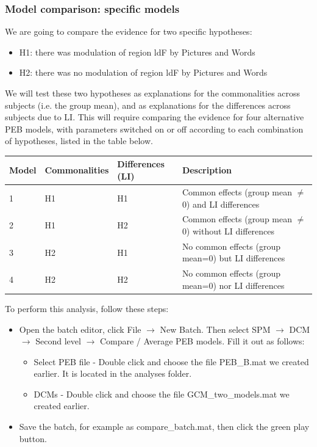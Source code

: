 \documentclass{article}
\begin{document}
\subsubsection{Model comparison: specific models} \label{GUI_specificDCMs}

We are going to compare the evidence for two specific hypotheses:

\begin{itemize}
    \item H1: there was modulation of region ldF by Pictures and Words
    \item H2: there was no modulation of region ldF by Pictures and Words
\end{itemize}

We will test these two hypotheses as explanations for the commonalities across subjects (i.e. the group mean), and as explanations for the differences across subjects due to LI. This will require comparing the evidence for four alternative PEB models, with parameters switched on or off according to each combination of hypotheses, listed in the table below. 

\begin{table}[h]
\begin{tabular}{|l|l|l|p{6cm}|}
\hline \textbf{Model}
 & \textbf{Commonalities} & \textbf{Differences (LI)} & \textbf{Description}                             \\ \hline
1              & H1                     & H1          & Common effects (group mean $\ne$ 0) and LI differences                                   \\ \hline
2              & H1                     & H2          & Common effects (group mean $\ne$ 0) without LI differences \\ \hline
3              & H2                     & H1          & No common effects (group mean=0) but LI differences        \\ \hline
4              & H2                     & H2          & No common effects (group mean=0) nor LI differences         \\ \hline
\end{tabular}
\end{table}

To perform this analysis, follow these steps:

\begin{itemize}
    \item Open the batch editor, click File $\rightarrow$ New Batch. Then select SPM $\rightarrow$ DCM $\rightarrow$ Second level $\rightarrow$ Compare / Average PEB models. Fill it out as follows:
    \begin{itemize}
        \item Select PEB file - Double click and choose the file PEB\_B.mat we created earlier. It is located in the analyses folder.
        \item DCMs - Double click and choose the file GCM\_two\_models.mat we created earlier.
    \end{itemize}
    \item Save the batch, for example as compare\_batch.mat, then click the green play button.
\end{itemize}
\end{document}
